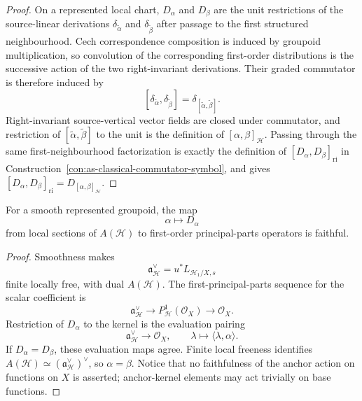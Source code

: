 \begin{proof}
On a represented local chart, $D_\alpha$ and $D_\beta$ are the unit
restrictions of the source-linear derivations
$\delta_{\widetilde\alpha}$ and $\delta_{\widetilde\beta}$ after passage to
the first structured neighbourhood.  Cech correspondence composition is
induced by groupoid multiplication, so convolution of the corresponding
first-order distributions is the successive action of the two
right-invariant derivations.  Their graded commutator is therefore induced by
\[
    [\delta_{\widetilde\alpha},\delta_{\widetilde\beta}]
    =
    \delta_{[\widetilde\alpha,\widetilde\beta]}.
\]
Right-invariant source-vertical vector fields are closed under commutator, and
restriction of
$[\widetilde\alpha,\widetilde\beta]$ to the unit is the definition of
$[\alpha,\beta]_{\mathcal H}$.  Passing through the same first-neighbourhood factorization is exactly the
definition of
$[D_\alpha,D_\beta]_{\mathrm{ri}}$ in
Construction~\ref{con:as-classical-commutator-symbol}, and gives
$[D_\alpha,D_\beta]_{\mathrm{ri}}=D_{[\alpha,\beta]_{\mathcal H}}$.
\end{proof}

\begin{lemma}
\label{lem:as-classical-first-symbol-faithful}
For a smooth represented groupoid, the map
\[
    \alpha\longmapsto D_\alpha
\]
from local sections of $A(\mathcal H)$ to first-order principal-parts
operators is faithful.
\end{lemma}

\begin{proof}
Smoothness makes
\[
    \mathfrak a_{\mathcal H}^{\vee}
    =
    u^*L_{\mathcal H_1/X,s}
\]
finite locally free, with dual
$A(\mathcal H)$.  The first-principal-parts sequence for the scalar
coefficient is
\[
    \mathfrak a_{\mathcal H}^{\vee}
    \longrightarrow
    P^1_{\mathcal H}(\mathcal O_X)
    \longrightarrow
    \mathcal O_X.
\]
Restriction of $D_\alpha$ to the kernel is the evaluation pairing
\[
    \mathfrak a_{\mathcal H}^{\vee}
    \longrightarrow
    \mathcal O_X,
    \qquad
    \lambda\longmapsto\langle\lambda,\alpha\rangle.
\]
If $D_\alpha=D_\beta$, these evaluation maps agree.  Finite local freeness
identifies
$A(\mathcal H)\simeq(\mathfrak a_{\mathcal H}^{\vee})^\vee$, so
$\alpha=\beta$.  Notice that no faithfulness of the anchor action on
functions on $X$ is asserted; anchor-kernel elements may act trivially on
base functions.
\end{proof}

